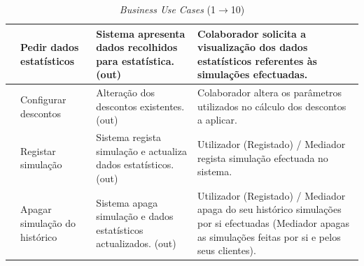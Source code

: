 \begin{table}[!htb]
\begin{center}
\begin{tabular}{|c|p{3cm}|p{3cm}|p{5cm}|}
		\hline
		\T \B 7 & \scriptsize{Pedir dados estatísticos} & \scriptsize{Sistema apresenta dados recolhidos para estatística. (out)} & \scriptsize{Colaborador solicita a visualização dos dados estatísticos referentes às simulações efectuadas.}\\
		\hline
		\T \B 8 & \scriptsize{Configurar descontos} & \scriptsize{Alteração dos descontos existentes. (out)} & \scriptsize{Colaborador altera os parâmetros utilizados no cálculo dos descontos a aplicar.}\\
		\hline
		\T \B 9 & \scriptsize{Registar simulação} & \scriptsize{Sistema regista simulação e actualiza dados estatísticos. (out)} & \scriptsize{Utilizador (Registado) / Mediador regista simulação efectuada no sistema.}\\
		\hline
		\T \B 10 & \scriptsize{Apagar simulação do histórico} & \scriptsize{Sistema apaga simulação e dados estatísticos actualizados. (out)} & \scriptsize{Utilizador (Registado) / Mediador apaga do seu histórico simulações por si efectuadas (Mediador apagas as simulações feitas por si e pelos seus clientes).}\\
		\hline
		\end{tabular}
		\caption{\emph{Business Use Cases} (1$\to$10)}
	\end{center}
\end{table}

